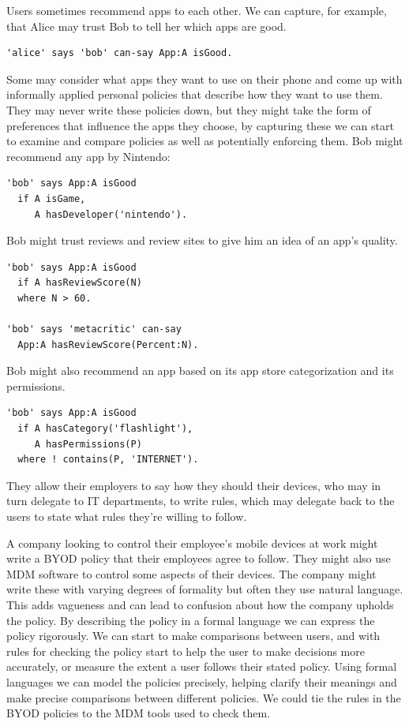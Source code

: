 \documentclass[thesis.tex]{subfiles}
\begin{document}
Users sometimes recommend apps to each other. We can capture, for example, that
Alice may trust Bob to tell her which apps are good.
%
\begin{lstlisting}
'alice' says 'bob' can-say App:A isGood.
\end{lstlisting}
%
Some may consider what apps they want to use on their phone and come up with
informally applied personal policies that describe how they want to use them.
They may never write these policies down, but they might take the form of
preferences that influence the apps they choose, by capturing these we can start
to examine and compare policies as well as potentially enforcing them. Bob might recommend any app by Nintendo:
%
\begin{lstlisting}
'bob' says App:A isGood
  if A isGame,
     A hasDeveloper('nintendo').
\end{lstlisting}
%
Bob might trust reviews and review sites to give him an idea of an app's quality. 
%
\begin{lstlisting}
'bob' says App:A isGood
  if A hasReviewScore(N)
  where N > 60.
 
'bob' says 'metacritic' can-say
  App:A hasReviewScore(Percent:N).
\end{lstlisting}
%
Bob might also recommend an app based on its app store categorization and its permissions.
%
\begin{lstlisting}
'bob' says App:A isGood
  if A hasCategory('flashlight'),
     A hasPermissions(P)
  where ! contains(P, 'INTERNET').
\end{lstlisting}

They allow their employers to say how they should their devices, who
may in turn delegate to IT departments, to write rules, which may
delegate back to the users to state what rules they're willing to
follow.

A company looking to control their employee's mobile devices at work
might write a \ac{BYOD} policy that their employees agree to
follow. They might also use \ac{MDM} software to control some aspects
of their devices. The company might write these with varying degrees
of formality but often they use natural language. This adds vagueness
and can lead to confusion about how the company upholds the policy. By
describing the policy in a formal language we can express the policy
rigorously. We can start to make comparisons between users, and with
rules for checking the policy start to help the user to make decisions
more accurately, or measure the extent a user follows their stated
policy. Using formal languages we can model the policies precisely,
helping clarify their meanings and make precise comparisons between
different policies. We could tie the rules in the \ac{BYOD} policies
to the \ac{MDM} tools used to check them.
\end{document}
